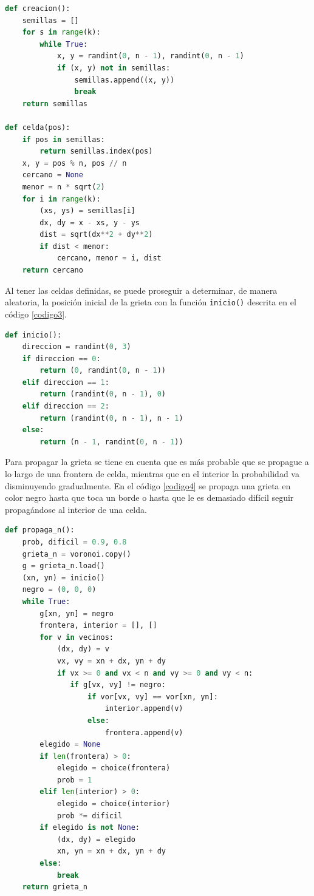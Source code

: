 \documentclass{article}
\begin{document}
\begin{lstlisting}[caption=Ubicaci\'on de semillas y celdas, label=codigo2, language=Python]
def creacion():
    semillas = []
    for s in range(k):
        while True:
            x, y = randint(0, n - 1), randint(0, n - 1)
            if (x, y) not in semillas:
                semillas.append((x, y))
                break
    return semillas

def celda(pos):
    if pos in semillas:
        return semillas.index(pos)
    x, y = pos % n, pos // n
    cercano = None
    menor = n * sqrt(2)
    for i in range(k):
        (xs, ys) = semillas[i]
        dx, dy = x - xs, y - ys
        dist = sqrt(dx**2 + dy**2)
        if dist < menor:
            cercano, menor = i, dist
    return cercano
\end{lstlisting}

Al tener las celdas definidas, se puede proseguir a determinar, de manera aleatoria, la posici\'on inicial de la grieta con la funci\'on \texttt{inicio()} descrita en el c\'odigo \ref{codigo3}.

\begin{lstlisting}[caption= Ubicaci\'on inicial de la grieta, label=codigo3, language=Python]
def inicio():
    direccion = randint(0, 3)
    if direccion == 0:
        return (0, randint(0, n - 1))
    elif direccion == 1:
        return (randint(0, n - 1), 0)
    elif direccion == 2:
        return (randint(0, n - 1), n - 1)
    else:
        return (n - 1, randint(0, n - 1))
\end{lstlisting}

Para propagar la grieta se tiene en cuenta que es m\'as probable que se propague a lo largo de una frontera de celda, mientras que en el interior la probabilidad va disminuyendo gradualmente. En el c\'odigo \ref{codigo4} se propaga una grieta en color negro hasta que toca un borde o hasta que le es demasiado dif\'icil seguir propag\'andose al interior de una celda.

\begin{lstlisting}[caption=Propagaci\'on de la primera grieta, label=codigo4, language=Python]
def propaga_n():
    prob, dificil = 0.9, 0.8
    grieta_n = voronoi.copy()
    g = grieta_n.load()
    (xn, yn) = inicio()
    negro = (0, 0, 0)
    while True:
        g[xn, yn] = negro
        frontera, interior = [], []
        for v in vecinos:
            (dx, dy) = v
            vx, vy = xn + dx, yn + dy
            if vx >= 0 and vx < n and vy >= 0 and vy < n:
               if g[vx, vy] != negro:
                   if vor[vx, vy] == vor[xn, yn]:
                       interior.append(v)
                   else:
                       frontera.append(v)
        elegido = None
        if len(frontera) > 0:
            elegido = choice(frontera)
            prob = 1
        elif len(interior) > 0:
            elegido = choice(interior)
            prob *= dificil
        if elegido is not None:
            (dx, dy) = elegido
            xn, yn = xn + dx, yn + dy
        else:
            break
    return grieta_n
\end{lstlisting}
\end{document}
